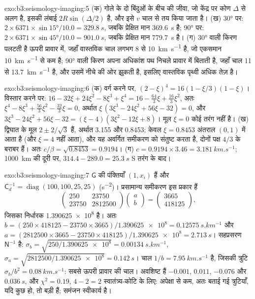 \begin{solution}{exo:b3:seismology-imaging:5}
(क) गोले के दो बिंदुओं के बीच की जीवा, जो केंद्र पर कोण $\Delta$ से अलग है,
इसकी लंबाई $2R\sin(\Delta/2)$ है, और इसे $v$ चाल से तय किया जाता है।
(ख) \ang{30} पर: $2\times6371\times\sin\ang{15}/10.0 = \qty{329.8}{s}$, जबकि प्रेक्षित मान
\qty{369.6}{s} है; \ang{90} पर: $2\times6371\times\sin\ang{45}/10.0 =
\qty{901.0}{s}$, जबकि प्रेक्षित मान \qty{779.7}{s} है। (ग) \ang{30} वाली किरण पलटती है
ऊपरी प्रावार में, जहाँ वास्तविक चाल लगभग 8 से \qty{10}{km.s^{-1}} है, जो
एकसमान \qty{10}{km.s^{-1}} से कम है; \ang{90} वाली किरण अपना अधिकांश पथ
निचले प्रावार में बिताती है, जहाँ चाल 11 से \qty{13.7}{km.s^{-1}} है, और उसमें नीचे की ओर झुकती है, इसलिए
वास्तविक पृथ्वी अधिक तेज़ है।
\end{solution}

\begin{solution}{exo:b3:seismology-imaging:6}
(क) वर्ग करने पर, $(2 - \xi)^4 = 16(1 - \xi/3)(1 - \xi)$। विस्तार करने पर:
$16 - 32\xi + 24\xi^2 - 8\xi^3 + \xi^4 = 16 - \tfrac{64}{3}\xi + \tfrac{16}{3}\xi^2$,
अतः $\xi^4 - 8\xi^3 + \tfrac{56}{3}\xi^2 - \tfrac{32}{3}\xi = 0$, अर्थात
$\xi\,(3\xi^3 - 24\xi^2 + 56\xi - 32) = 0$, और
$3\xi^3 - 24\xi^2 + 56\xi - 32 = (\xi - 4)(3\xi^2 - 12\xi + 8)$। मूल
$\xi = 0$ कोई तरंग नहीं है। (ख) द्विघात के मूल $2 \pm 2/\sqrt3$ हैं,
अर्थात 3.155 और 0.8453; केवल $\xi = 0.8453$ अंतराल $(0, 1)$ में आता है (और $\xi = 4$
नहीं आता), और यह अवर्गित समीकरण को संतुष्ट करता है, दोनों पक्ष $4/3$ के बराबर हैं।
अतः $c/\beta = \sqrt{0.8453} = 0.9194$। (ग) $c = 0.9194\times3.46 =
\qty{3.181}{km.s^{-1}}$; \qty{1000}{km} की दूरी पर, $314.4 - 289.0 = \qty{25.3}{s}$
S तरंग के बाद।
\end{solution}

\begin{solution}{exo:b3:seismology-imaging:7}
$\mathsf G$ की पंक्तियाँ $(1, x_i)$ हैं और $\mathsf C_d^{-1} = \operatorname{diag}
(100, 100, 25, 25)$ (\unit{s^{-2}})। प्रसामान्य समीकरण इस प्रकार हैं
\[
  \begin{pmatrix} 250 & 23750 \\ 23750 & \num{2812500} \end{pmatrix}
  \begin{pmatrix} a \\ b \end{pmatrix}
  = \begin{pmatrix} 3665 \\ 418125 \end{pmatrix},
\]
जिसका निर्धारक \num{1.390625e8} है। अतः $b = (250\times418125 -
23750\times3665)/\num{1.390625e8} = \qty{0.12575}{s.km^{-1}}$ और
$a = (2812500\times3665 - 23750\times418125)/\num{1.390625e8} =
\qty{2.713}{s}$। सहप्रसरण $\mathsf N^{-1}$ है: $\sigma_b =
\sqrt{250/\num{1.390625e8}} = \qty{0.00134}{s.km^{-1}}$, $\sigma_a =
\sqrt{2812500/\num{1.390625e8}} = \qty{0.142}{s}$। चाल
$1/b = \qty{7.95}{km.s^{-1}}$ है, जिसकी त्रुटि $\sigma_b/b^2 =
\qty{0.08}{km.s^{-1}}$: सबसे ऊपरी प्रावार की चाल। अवशिष्ट हैं $-0.001$,
$0.011$, $-0.076$ और $\qty{0.036}{s}$, और $\chi^2 = 0.19$, $4 - 2 = 2$
स्वातंत्र्य-कोटि के लिए: अपेक्षा से कम, अतः बताई गई त्रुटियाँ, यदि कुछ हो,
तो बड़ी हैं; समंजन स्वीकार्य है।
\end{solution}

